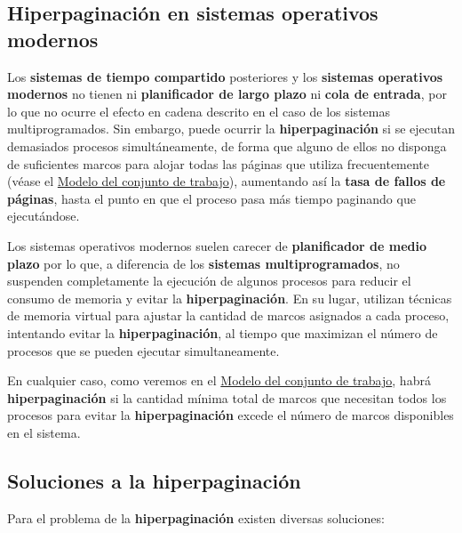 \subsection{Hiperpaginación en sistemas operativos
modernos}\label{_hiperpaginaciuxf3n_en_sistemas_operativos_modernos}

Los \textbf{sistemas de tiempo compartido} posteriores y los
\textbf{sistemas operativos modernos} no tienen ni \textbf{planificador
de largo plazo} ni \textbf{cola de entrada}, por lo que no ocurre el
efecto en cadena descrito en el caso de los sistemas multiprogramados.
Sin embargo, puede ocurrir la \textbf{hiperpaginación} si se ejecutan
demasiados procesos simultáneamente, de forma que alguno de ellos no
disponga de suficientes marcos para alojar todas las páginas que utiliza
frecuentemente (véase el
\hyperref[_modelo_del_conjunto_de_trabajo]{Modelo del conjunto de
trabajo}), aumentando así la \textbf{tasa de fallos de páginas}, hasta
el punto en que el proceso pasa más tiempo paginando que ejecutándose.

Los sistemas operativos modernos suelen carecer de \textbf{planificador
de medio plazo} por lo que, a diferencia de los \textbf{sistemas
multiprogramados}, no suspenden completamente la ejecución de algunos
procesos para reducir el consumo de memoria y evitar la
\textbf{hiperpaginación}. En su lugar, utilizan técnicas de memoria
virtual para ajustar la cantidad de marcos asignados a cada proceso,
intentando evitar la \textbf{hiperpaginación}, al tiempo que maximizan
el número de procesos que se pueden ejecutar simultaneamente.

En cualquier caso, como veremos en el
\hyperref[_modelo_del_conjunto_de_trabajo]{Modelo del conjunto de
trabajo}, habrá \textbf{hiperpaginación} si la cantidad mínima total de
marcos que necesitan todos los procesos para evitar la
\textbf{hiperpaginación} excede el número de marcos disponibles en el
sistema.

\subsection{Soluciones a la
hiperpaginación}\label{_soluciones_a_la_hiperpaginaciuxf3n}

Para el problema de la \textbf{hiperpaginación} existen diversas
soluciones:

